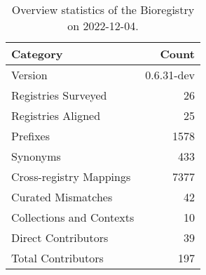 \begin{table}
\centering
\caption{Overview statistics of the Bioregistry on 2022-12-04.}
\label{tab:bioregistry-summary}
\begin{tabular}{lr}
\toprule
                Category &      Count \\
\midrule
                 Version & 0.6.31-dev \\
     Registries Surveyed &         26 \\
      Registries Aligned &         25 \\
                Prefixes &       1578 \\
                Synonyms &        433 \\
 Cross-registry Mappings &       7377 \\
      Curated Mismatches &         42 \\
Collections and Contexts &         10 \\
     Direct Contributors &         39 \\
      Total Contributors &        197 \\
\bottomrule
\end{tabular}
\end{table}
